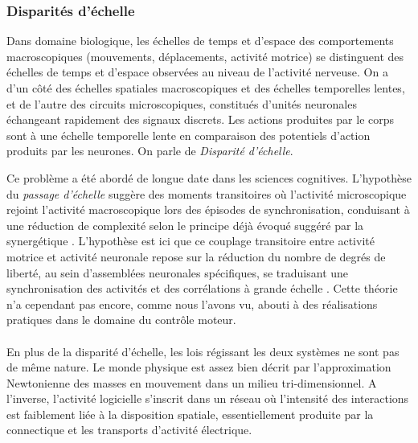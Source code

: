 \documentclass[11pt]{article}
\begin{document}
\subsubsection{Disparités d'échelle}\label{page:echelle}
Dans domaine biologique, les échelles de temps et d'espace des comportements macroscopiques 
(mouvements, déplacements, activité motrice)  
se distinguent des échelles de temps et d'espace observées au niveau de l'activité
nerveuse.
On a d'un côté des échelles
spatiales macroscopiques et des échelles temporelles lentes, et de l'autre des circuits microscopiques, constitués d'unités neuronales échangeant rapidement des signaux discrets.
Les actions produites par le corps sont à une échelle temporelle lente en comparaison des potentiels d'action
produits par les neurones. On parle de \textit{Disparité d'échelle}.

Ce problème a été abordé de longue date dans les sciences cognitives.
L'hypothèse du \textit{passage d'échelle} suggère des moments transitoires où l'activité microscopique rejoint 
l'activité macroscopique lors des épisodes de synchronisation, conduisant à une réduction de 
complexité selon le principe déjà évoqué suggéré par la synergétique .
L'hypothèse est ici que ce couplage transitoire entre activité motrice et activité neuronale repose sur la réduction du nombre de degrés de liberté, au sein d'assemblées neuronales spécifiques, se traduisant une synchronisation des activités et des corrélations à grande échelle .
Cette théorie n'a cependant pas encore, comme nous l'avons vu, abouti à des réalisations pratiques dans le domaine du contrôle moteur.

\paragraph{}
	En plus de la disparité d'échelle, les lois régissant les deux systèmes ne sont pas de même nature. 
	Le monde physique est assez bien décrit par 
	l'approximation Newtonienne des masses en mouvement dans un milieu tri-dimensionnel.
	A l'inverse, l'activité logicielle s'inscrit dans un réseau où l'intensité des interactions est 
	faiblement liée à la disposition spatiale, essentiellement produite par la connectique et 
	les transports d'activité électrique.
	
\end{document}
